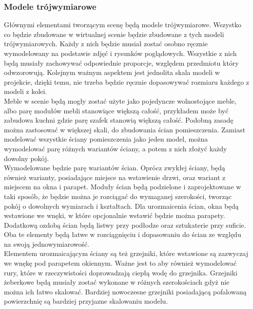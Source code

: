 \documentclass{article} %
\begin{document}
        \subsubsection{Modele trójwymiarowe}
            Głównymi elementami tworzącym scenę będą modele trójwymiarowe. Wszystko co będzie zbudowane w wirtualnej scenie będzie zbudowane z tych modeli trójwymiarowych. Każdy z nich będzie musiał zostać osobno ręcznie wymodelowany na podstawie zdjęć i rysunków poglądowych. Wszystkie z nich będą musiały zachowywać odpowiednie proporcje, względem przedmiotu który odwzorowują. Kolejnym ważnym aspektem jest jednolita skala modeli w projekcie, dzięki temu, nie trzeba będzie ręcznie dopasowywać rozmiaru każdego z modeli z kolei.
            \\
            
            Meble w scenie będą mogły zostać użyte jako pojedyncze wolnostojące meble, albo parę modułów mebli stanowiące większą całość, przykładem może być zabudowa kuchni gdzie parę szafek stanowią większą całość. Podobną zasadę można zastosować w większej skali, do zbudowania ścian pomieszczenia. Zamiast modelować wszystkie ściany pomieszczenia jako jeden model, można wymodelować parę różnych wariantów ściany, a potem z nich złożyć każdy dowolny pokój.
            \\
            
            Wymodelowane będzie parę wariantów ścian. Oprócz zwykłej ściany, będą również warianty, posiadające miejsce na wstawienie drzwi, oraz wariant z miejscem na okna i parapet. Moduły ścian będą podzielone i zaprojektowane w taki sposób, że będzie można je rozciągać do wymaganej szerokości, tworząc pokój o dowolnych wymiarach i kształtach. Dla urozmaicenia ścian, okna będą wstawione we wnęki, w które opcjonalnie wstawić będzie można parapety. Dodatkową ozdobą ścian będą listwy przy podłodze oraz sztukaterie przy suficie. Oba te elementy będą łatwe w rozciągnięciu i dopasowaniu do ścian ze względu na swoją jednowymiarowość.
            \\
            
            Elementem urozmaicającym ściany są też grzejniki, które wstawione są zazwyczaj we wnękę pod parapetem okiennym. Ważne jest to aby również wymodelować rury, które w rzeczywistości doprowadzają ciepłą wodę do grzejnika. Grzejniki żeberkowe będą musiały zostać wykonane w różnych szerokościach gdyż nie można ich łatwo skalować. Bardziej nowoczesne grzejniki posiadającą pofalowaną powierzchnię są bardziej przyjazne skalowaniu modelu.
            \\
            
\end{document}
